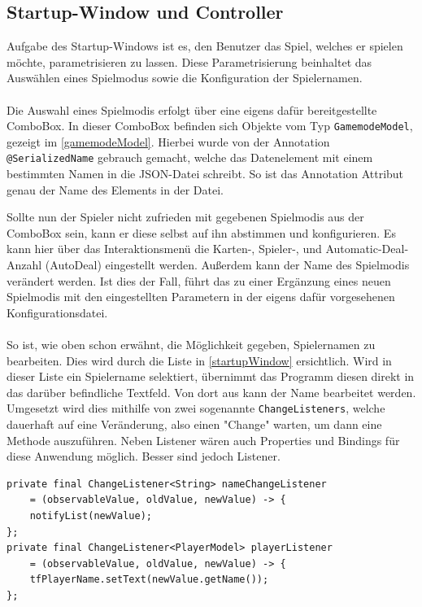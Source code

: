 \subsection{Startup-Window und Controller}\label{subsec:startupController}
Aufgabe des Startup-Windows ist es, den Benutzer das Spiel, welches er spielen möchte, parametrisieren zu lassen.
Diese Parametrisierung beinhaltet das Auswählen eines Spielmodus sowie die Konfiguration der Spielernamen.\\\\
Die Auswahl eines Spielmodis erfolgt über eine eigens dafür bereitgestellte ComboBox.
In dieser ComboBox befinden sich Objekte vom Typ \lstinline[style=java]{GamemodeModel}, gezeigt im \autoref{gamemodeModel}.
Hierbei wurde von der Annotation \lstinline[style=java]{@SerializedName} gebrauch gemacht, welche das Datenelement mit einem bestimmten Namen in die JSON-Datei schreibt.
So ist das Annotation Attribut genau der Name des Elements in der Datei.

Sollte nun der Spieler nicht zufrieden mit gegebenen Spielmodis aus der ComboBox sein, kann er diese selbst auf ihn abstimmen und konfigurieren.
Es kann hier über das Interaktionsmenü die Karten-, Spieler-, und Automatic-Deal-Anzahl (AutoDeal) eingestellt werden.
Außerdem kann der Name des Spielmodis verändert werden.
Ist dies der Fall, führt das zu einer Ergänzung eines neuen Spielmodis mit den eingestellten Parametern in der eigens dafür vorgesehenen Konfigurationsdatei.\\\\
So ist, wie oben schon erwähnt, die Möglichkeit gegeben, Spielernamen zu bearbeiten.
Dies wird durch die Liste in \autoref{startupWindow} ersichtlich.
Wird in dieser Liste ein Spielername selektiert, übernimmt das Programm diesen direkt in das darüber befindliche Textfeld.
Von dort aus kann der Name bearbeitet werden.\\
Umgesetzt wird dies mithilfe von zwei sogenannte \lstinline[style=java]{ChangeListeners}, welche dauerhaft auf eine Veränderung, also einen "Change" warten, um dann eine Methode auszuführen.
Neben Listener wären auch Properties und Bindings für diese Anwendung möglich.
Besser sind jedoch Listener.
%
\begin{lstlisting}[style=java,caption=Deklaration ChangeListener,label=changelistener]
private final ChangeListener<String> nameChangeListener
    = (observableValue, oldValue, newValue) -> {
    notifyList(newValue);
};
private final ChangeListener<PlayerModel> playerListener
    = (observableValue, oldValue, newValue) -> {
    tfPlayerName.setText(newValue.getName());
};
\end{lstlisting}
